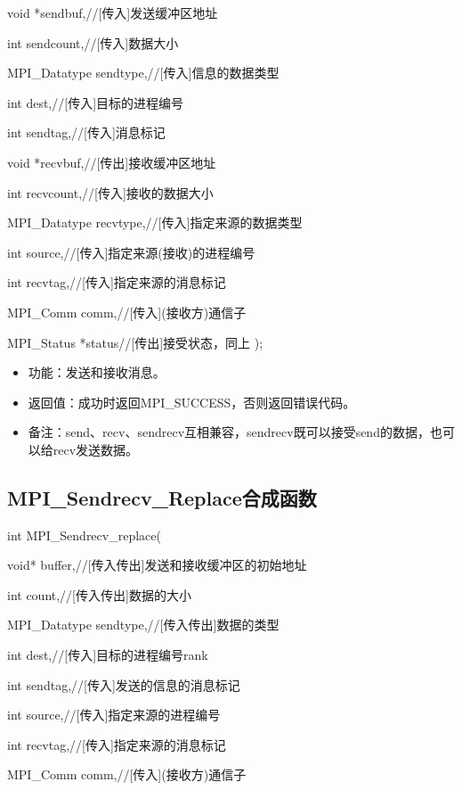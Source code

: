 \documentclass[UTF8]{article}%
\begin{document}
    \qquad void         *sendbuf,//[传入]发送缓冲区地址
    
    \qquad int          sendcount,//[传入]数据大小

    \qquad MPI\_Datatype sendtype,//[传入]信息的数据类型

    \qquad int          dest,//[传入]目标的进程编号

    \qquad int          sendtag,//[传入]消息标记

    \qquad void         *recvbuf,//[传出]接收缓冲区地址

    \qquad int          recvcount,//[传入]接收的数据大小

    \qquad MPI\_Datatype recvtype,//[传入]指定来源的数据类型

    \qquad int          source,//[传入]指定来源(接收)的进程编号

    \qquad int          recvtag,//[传入]指定来源的消息标记

    \qquad MPI\_Comm     comm,//[传入](接收方)通信子

    \qquad MPI\_Status   *status//[传出]接受状态，同上
);

\begin{itemize}
    \item 功能：发送和接收消息。
    \item 返回值：成功时返回MPI\_SUCCESS，否则返回错误代码。
    \item 备注：send、recv、sendrecv互相兼容，sendrecv既可以接受send的数据，也可以给recv发送数据。
\end{itemize}

\subsection{MPI\_Sendrecv\_Replace合成函数}

int MPI\_Sendrecv\_replace(

    \qquad void* buffer,//[传入传出]发送和接收缓冲区的初始地址

    \qquad int count,//[传入传出]数据的大小

    \qquad MPI\_Datatype sendtype,//[传入传出]数据的类型

    \qquad int dest,//[传入]目标的进程编号rank

    \qquad int sendtag,//[传入]发送的信息的消息标记

    \qquad int source,//[传入]指定来源的进程编号

    \qquad int recvtag,//[传入]指定来源的消息标记

    \qquad MPI\_Comm comm,//[传入](接收方)通信子
\end{document}
